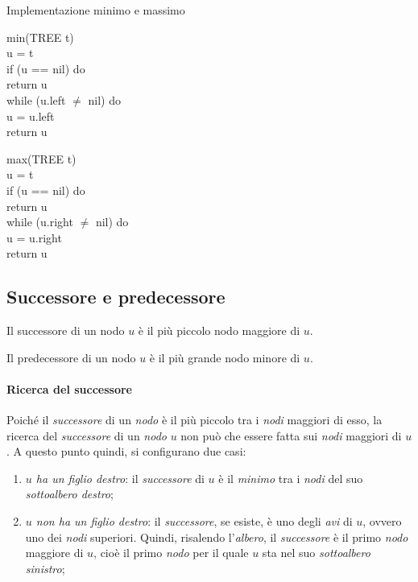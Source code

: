 \begin{code}{Implementazione minimo e massimo}
    \begin{minipage}[t]{0.48\textwidth}
        \rmbreak\ind{} min(TREE t)\\
             u = t\\
            \indf if (u == nil) do\\
                return u\\
            \indf while (u.left $\neq$ nil) do\\
                u = u.left\\
            \indf return u
    \end{minipage}
    \hfill
    \begin{minipage}[t]{0.48\textwidth}
        \rmbreak\ind{} max(TREE t)\\
             u = t\\
            \indf if (u == nil) do\\
                return u\\
            \indf while (u.right $\neq$ nil) do\\
                u = u.right\\
            \indf return u
    \end{minipage}
\end{code}

\subsection{Successore e predecessore}
\begin{definition}[Successore]
    Il successore di un nodo $u$ è il più piccolo nodo maggiore di $u$.
\end{definition}
\begin{definition}[Predecessore]
    Il predecessore di un nodo $u$ è il più grande nodo minore di $u$.
\end{definition}

\paragraph{Ricerca del successore}
Poiché il \emph{successore} di un \emph{nodo} è il più piccolo tra i \emph{nodi}
maggiori di esso, la ricerca del \emph{successore} di un \emph{nodo} $u$ non
può che essere fatta sui \emph{nodi} maggiori di $u$.
A questo punto quindi, si configurano due casi:
\begin{enumerate}
    \item \emph{$u$ ha un figlio destro}: il \emph{successore} di $u$ è
    il \emph{minimo} tra i \emph{nodi} del suo \emph{sottoalbero destro};
    \item \emph{$u$ non ha un figlio destro}: il \emph{successore}, se esiste, è
    uno degli \emph{avi} di $u$, ovvero uno dei \emph{nodi} superiori.
    Quindi, risalendo l'\emph{albero}, il \emph{successore} è il primo \emph{nodo}
    maggiore di $u$, cioè il primo \emph{nodo} per il quale $u$ sta nel suo
    \emph{sottoalbero sinistro};
\end{enumerate}

